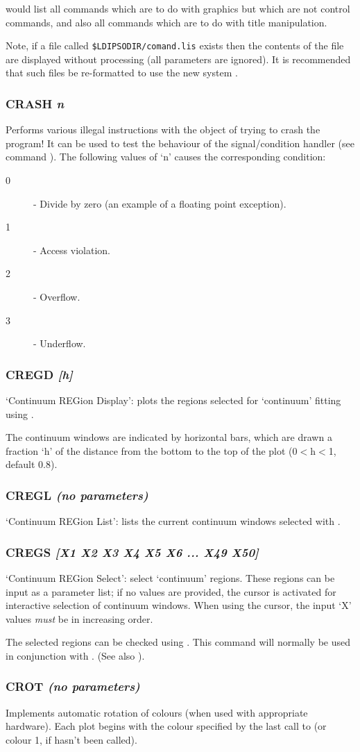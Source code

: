 \documentclass[twoside,11pt,noabs,nolof]{starlink}
\providecommand{\dipcom}[3]{\subsubsection*{\label{COM:#1}\xlabel{COM:#1}\textbf{#1} \emph{#2}}}
\newenvironment{dipdesc}{\begin{description}}{\end{description}}
\providecommand{\dipitem}[2]{ \item[{#1}] {#2} }
\begin{document}
would list all commands which are to do with graphics but which are not
control commands, and also all commands which are to do with title
manipulation.

Note, if a file called {\texttt{\$LDIPSODIR/comand\-.lis}}  exists then the
contents of the file are displayed without processing (all parameters are
ignored). It is recommended that such files be re-formatted to use the
new system .

\dipcom{CRASH}{n}{Induce an exception}
Performs various illegal instructions with the object of trying to
crash the program! It can be used to test the behaviour of the signal/condition
handler (see command ).  The following values of `n' causes the
corresponding condition:

\begin{dipdesc}
\dipitem{0}{ - Divide by zero (an example of a floating point exception).}
\dipitem{1}{ - Access violation.}
\dipitem{2}{ - Overflow.}
\dipitem{3}{ - Underflow.}
\end{dipdesc}

\dipcom{CREGD}{[h]}{plots the regions selected for 'continuum' fitting using {\texttt{CREGS}}}
`Continuum REGion Display': plots the regions selected for `continuum'
fitting using .

The continuum windows are indicated by horizontal bars, which are
drawn a fraction `h' of the distance from the bottom to the top of the
plot (0$<$h$<$1, default 0.8).

\dipcom{CREGL}{(no parameters)}{Lists the current 'continuum' window selected with {\texttt{CREGS}}}
`Continuum REGion List': lists the current continuum windows selected
with .

\dipcom{CREGS}{[X1 X2 X3 X4 X5 X6 ... X49 X50]}{Selects 'continuum' regions}
`Continuum REGion Select': select `continuum' regions. These regions
can be input as a parameter list; if no values are provided, the
cursor is activated for interactive selection of continuum windows.
When using the cursor, the input `X' values \emph{must} be in
increasing order.

The selected regions can be checked using .  This command will
normally be used in conjunction with .  (See also ).

\dipcom{CROT}{(no parameters)}{Causes automatic rotation of plotting colours}
Implements automatic rotation of colours (when used with appropriate
hardware). Each plot begins with the colour specified by the last call
to   (or colour 1, if   hasn't been called).
\end{document}

